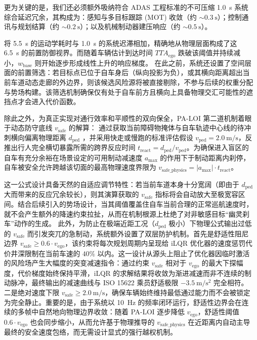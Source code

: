 \documentclass[conference]{IEEEtran}
\begin{document}
更为关键的是，我们还必须额外吸纳符合 ADAS 工程标准的不可压缩 \SI{1.0}{\second} 系统综合延迟冗余，其构成为：感知与多目标跟踪 (MOT) 收敛（约 $\sim\!\SI{0.3}{\second}$）；控制通讯与规划结算（约 $\sim\!\SI{0.2}{\second}$）；以及机械制动器建压响应（约 $\sim\!\SI{0.5}{\second}$）。

将 \SI{5.5}{\second} 的运动学耗时与 \SI{1.0}{\second} 的系统迟滞相加，精确地从物理层面构成了这 \SI{6.5}{\second} 的前置防御视界。而随着车辆估计到达时间 $TTA_{\text{ego}}$ 跌破该阈值并持续减小，$w_{\text{base}}$ 则开始逐步形成线性上升的响应梯度。
在此之前，系统还设置了空间层面的前置筛选：若目标点已位于自车身后（纵向投影为负），或其横向距离超出当前车道动态走廊的外边界，则该候选风险源将被直接剔除，不参与后续的权重分配与势场构建。该筛选机制确保仅有处于自车前方且横向上具备物理交汇可能性的遮挡点才会进入代价函数。

除此之外，为真正实现对通行效率和平顺性的双向保全，PA-LOI 第二道机制着眼于动态防守底线 $v_{\text{safe}}$ 的解算：
通过获取当前障碍物掩体与自车轨迹中心线的待冲刺横向偏离物理距离 $d_{\text{ped}}$ ，并采用快走或慢跑的标准评估假设 $v_{\text{ped}} = \SI{2.0}{\meter\per\second}$，反推出行人完全横切暴露所需的跨界反应时间 $t_{\text{react}} = d_{\text{ped}} / v_{\text{ped}}$。为确保进入盲区的自车有充分余裕在场景设定的可用制动减速度 $a_{\text{max}}$ 的作用下于制动距离内刹停，自车被安全允许跨越该切面的最高物理速度界限为 $v_{\text{safe\_physics}} = |a_{\text{max}}| \cdot t_{\text{react}}$。

这一公式设计具备天然的自适应调节特性：若当前车道本身十分宽阔（即由于 $d_{\text{ped}}$ 大而带来的反应冗余较长），则其演算获取的 $v_{\text{safe}}$ 指标将会自动放大至极宽容区间。结合后续引入的势场设计，当其阈值覆盖住自车当前合理的正常巡航速度时，就不会产生额外的降速约束拉扯，从而在机制根源上杜绝了对非敏感目标“幽灵刹车”动作的生成。
此外，为防止在极端近距工况（$d_{\text{ped}}$ 极小）下物理公式输出过低的 $v_{\text{safe}}$ 而引发突兀的急制动，系统额外设置了双层防护机制。首先是舒适性阻尼边界 $v_{\text{safe}} \geq 0.6 \cdot v_{\text{ego}}$，该约束将每次规划周期内呈现给 iLQR 优化器的速度惩罚代价井深限制在当前车速的 $40\%$ 以内。这一设计从源头上阻止了优化器因临时激活的风险场产生大幅度的突变减速指令：通过约束 $v_{\text{safe}}$ 相对于 $v_{\text{ego}}$ 的最大下探幅度，代价梯度始终保持平滑，iLQR 的求解结果将收敛为渐进减速而非不连续的制动脉冲，最终输出的减速曲线与 ISO 15622 乘员舒适极限 $\SI{-3.5}{\meter\per\second\squared}$ 完全相符。二是绝对速度下限 $v_{\text{safe}} \geq \SI{2.0}{\meter\per\second}$，确保车辆始终维持最低通过能力而不会被锁定为完全静止。重要的是，由于系统以 \SI{10}{\hertz} 的频率闭环运行，舒适性边界会在连续的多帧中自然地向物理边界收敛：随着 PA-LOI 逐步降低 $v_{\text{ego}}$，舒适性阈值 $0.6 \cdot v_{\text{ego}}$ 也会同步缩小，从而允许基于物理推导的 $v_{\text{safe\_physics}}$ 在近距离内自动主导最终的安全速度包络，而无需设计显式的强行越权机制。
\end{document}
